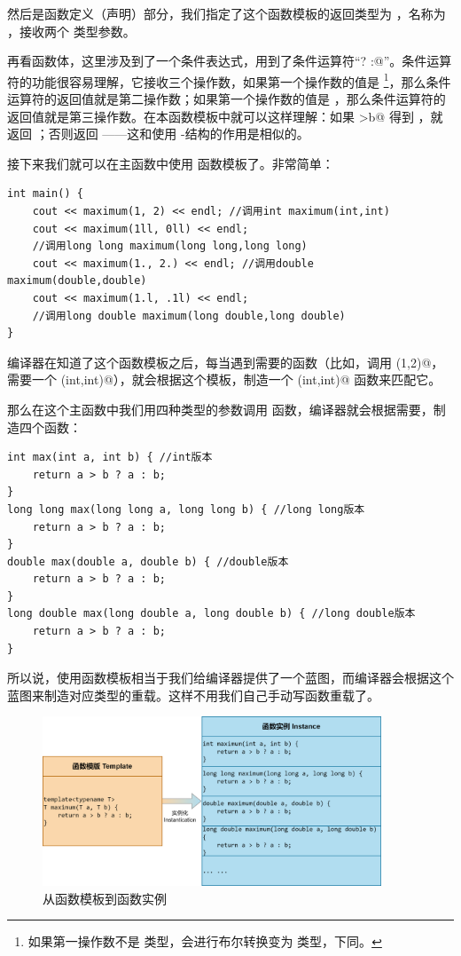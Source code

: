 然后是函数定义（声明）部分，我们指定了这个函数模板的返回类型为 \lstinline@T@，名称为 \lstinline@maximum@，接收两个 \lstinline@T@ 类型参数。\par
再看函数体，这里涉及到了一个条件表达式，用到了条件运算符``\lstinline@? :@''。条件运算符的功能很容易理解，它接收三个操作数，如果第一个操作数的值是 \lstinline@true@\footnote{如果第一操作数不是 \lstinline@bool@ 类型，会进行布尔转换变为 \lstinline@bool@ 类型，下同。}，那么条件运算符的返回值就是第二操作数；如果第一个操作数的值是 \lstinline@false@，那么条件运算符的返回值就是第三操作数。在本函数模板中就可以这样理解：如果 \lstinline@a>b@ 得到 \lstinline@true@，就返回 \lstinline@a@；否则返回 \lstinline@b@——这和使用 \lstinline@if@-\lstinline@else@ 结构的作用是相似的。\par
接下来我们就可以在主函数中使用 \lstinline@maximum@ 函数模板了。非常简单：
\begin{lstlisting}
int main() {
    cout << maximum(1, 2) << endl; //调用int maximum(int,int)
    cout << maximum(1ll, 0ll) << endl;
    //调用long long maximum(long long,long long)
    cout << maximum(1., 2.) << endl; //调用double maximum(double,double)
    cout << maximum(1.l, .1l) << endl;
    //调用long double maximum(long double,long double)
}
\end{lstlisting}
编译器在知道了这个函数模板之后，每当遇到需要的函数（比如，调用 \lstinline@maximum(1,2)@，需要一个 \lstinline@maximum(int,int)@），就会根据这个模板，制造一个 \lstinline@maximum(int,int)@ 函数来匹配它。\par
那么在这个主函数中我们用四种类型的参数调用 \lstinline@maximum@ 函数，编译器就会根据需要，制造四个函数：
\begin{lstlisting}
int max(int a, int b) { //int版本
    return a > b ? a : b;
}
long long max(long long a, long long b) { //long long版本
    return a > b ? a : b;
}
double max(double a, double b) { //double版本
    return a > b ? a : b;
}
long double max(long double a, long double b) { //long double版本
    return a > b ? a : b;
}
\end{lstlisting}\par
所以说，使用函数模板相当于我们给编译器提供了一个蓝图，而编译器会根据这个蓝图来制造对应类型的重载。这样不用我们自己手动写函数重载了。\par
\begin{figure}[htbp]
    \centering
    \includegraphics[width=0.9\textwidth]{.//images/generalized_parts/04_function_template_and_instance.drawio.png}
    \caption{从函数模板到函数实例}
\end{figure}
